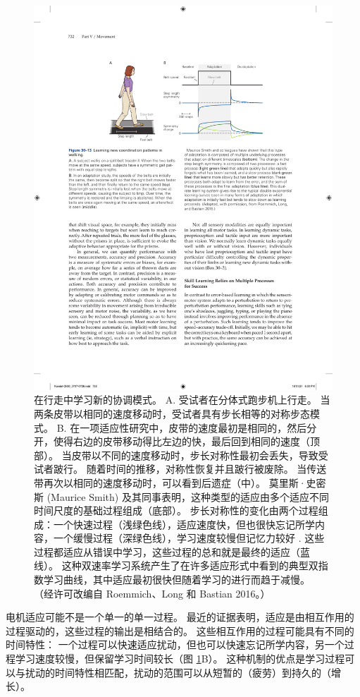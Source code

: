 \begin{figure}[htbp]
	\centering
	\includegraphics[width=0.7\linewidth]{chap30/fig_30_13}
	\caption{在行走中学习新的协调模式。 A. 受试者在分体式跑步机上行走。 当两条皮带以相同的速度移动时，受试者具有步长相等的对称步态模式。 B. 在一项适应性研究中，皮带的速度最初是相同的，然后分开，使得右边的皮带移动得比左边的快，最后回到相同的速度（顶部）。 当皮带以不同的速度移动时，步长对称性最初会丢失，导致受试者跛行。 随着时间的推移，对称性恢复并且跛行被废除。 当传送带再次以相同的速度移动时，可以看到后遗症（中）。 莫里斯·史密斯 (Maurice Smith) 及其同事表明，这种类型的适应由多个适应不同时间尺度的基础过程组成（底部）。 步长对称性的变化由两个过程组成：一个快速过程（浅绿色线），适应速度快，但也很快忘记所学内容，一个缓慢过程（深绿色线），学习速度较慢但记忆力较好 . 这些过程都适应从错误中学习，这些过程的总和就是最终的适应（蓝线）。 这种双速率学习系统产生了在许多适应形式中看到的典型双指数学习曲线，其中适应最初很快但随着学习的进行而趋于减慢。 （经许可改编自 Roemmich、Long 和 Bastian 2016。）}
	\label{fig:30_13}
\end{figure}


电机适应可能不是一个单一的单一过程。
最近的证据表明，适应是由相互作用的过程驱动的，这些过程的输出是相结合的。
这些相互作用的过程可能具有不同的时间特性：
一个过程可以快速适应扰动，但也可以快速忘记所学内容，另一个过程学习速度较慢，但保留学习时间较长（图 \ref{fig:30_13}B）。
这种机制的优点是学习过程可以与扰动的时间特性相匹配，扰动的范围可以从短暂的（疲劳）到持久的（增长）。


